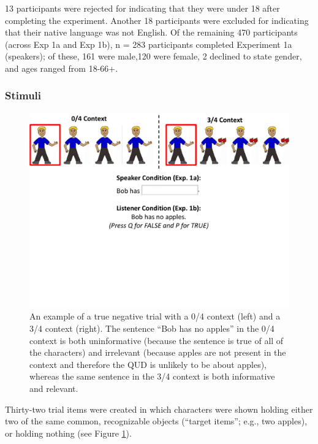 \documentclass[man, floatsintext, noapacite]{apa6}
\begin{document}
 13 participants were rejected for indicating that they were under 18 after completing the experiment. Another 18 participants were excluded for indicating that their native language was not English. Of the remaining 470 participants (across Exp 1a and Exp 1b), n = 283 participants completed Experiment 1a (speakers); of these, 161 were male,120 were female, 2 declined to state gender, and ages ranged from 18-66+.

\subsubsection{Stimuli}

\begin{figure}[t]
\begin{center} 
\includegraphics[width=6in]{figures/experiment1/trialfig_exp1.pdf}
\caption{\label{fig:exp1_trial} An example of a true negative trial with a 0/4 context (left) and a 3/4 context (right).  The sentence ``Bob has no apples'' in the 0/4 context is both uninformative (because the sentence is true of all of the characters) and irrelevant (because apples are not present in the context and therefore the QUD is unlikely to be about apples), whereas the same sentence in the 3/4 context is both informative and relevant. }
\vspace{-5mm}
\end{center} 
\end{figure}

Thirty-two trial items were created in which characters were shown holding either two of the same common, recognizable objects (``target items''; e.g., two apples), or holding nothing (see Figure \ref{fig:exp1_trial}). 
\end{document}
